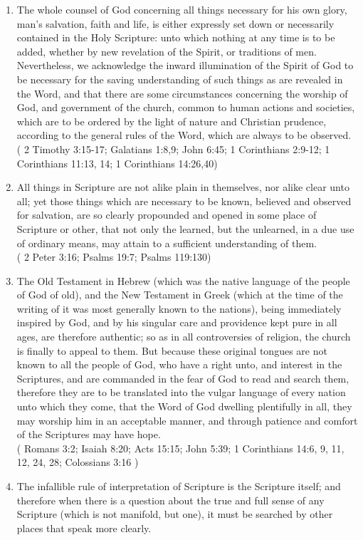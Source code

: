 \documentclass[12pt,a4paper]{book}
\begin{document}
\begin{enumerate}
\item The whole counsel of God concerning all things necessary for his own glory, man's salvation, faith and life, is either expressly set down or necessarily contained in the Holy Scripture: unto which nothing at any time is to be added, whether by new revelation of the Spirit, or traditions of men. Nevertheless, we acknowledge the inward illumination of the Spirit of God to be necessary for the saving understanding of such things as are revealed in the Word, and that there are some circumstances concerning the worship of God, and government of the church, common to human actions and societies, which are to be ordered by the light of nature and Christian prudence, according to the general rules of the Word, which are always to be observed.\\
( 2 Timothy 3:15-17; Galatians 1:8,9; John 6:45; 1 Corinthians 2:9-12; 1 Corinthians 11:13, 14; 1 Corinthians 14:26,40)
\item All things in Scripture are not alike plain in themselves, nor alike clear unto all; yet those things which are necessary to be known, believed and observed for salvation, are so clearly propounded and opened in some place of Scripture or other, that not only the learned, but the unlearned, in a due use of ordinary means, may attain to a sufficient understanding of them.\\
( 2 Peter 3:16; Psalms 19:7; Psalms 119:130)
\item The Old Testament in Hebrew (which was the native language of the people of God of old), and the New Testament in Greek (which at the time of the writing of it was most generally known to the nations), being immediately inspired by God, and by his singular care and providence kept pure in all ages, are therefore authentic; so as in all controversies of religion, the church is finally to appeal to them. But because these original tongues are not known to all the people of God, who have a right unto, and interest in the Scriptures, and are commanded in the fear of God to read and search them, therefore they are to be translated into the vulgar language of every nation unto which they come, that the Word of God dwelling plentifully in all, they may worship him in an acceptable manner, and through patience and comfort of the Scriptures may have hope.\\
( Romans 3:2; Isaiah 8:20; Acts 15:15; John 5:39; 1 Corinthians 14:6, 9, 11, 12, 24, 28; Colossians 3:16 )
\item The infallible rule of interpretation of Scripture is the Scripture itself; and therefore when there is a question about the true and full sense of any Scripture (which is not manifold, but one), it must be searched by other places that speak more clearly.\\

\end{enumerate}
\end{document}
